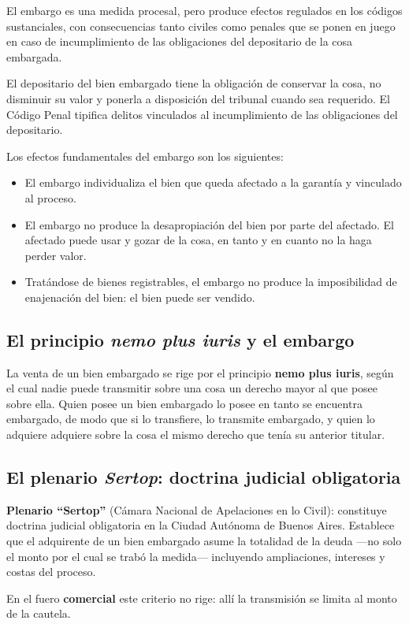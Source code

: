 \documentclass[12pt,oneside]{book}
\begin{document}
El embargo es una medida procesal, pero produce efectos regulados en los códigos sustanciales, con consecuencias tanto civiles como penales que se ponen en juego en caso de incumplimiento de las obligaciones del depositario de la cosa embargada.

\begin{important}
El depositario del bien embargado tiene la obligación de conservar la cosa, no disminuir su valor y ponerla a disposición del tribunal cuando sea requerido. El Código Penal tipifica delitos vinculados al incumplimiento de las obligaciones del depositario.
\end{important}

Los efectos fundamentales del embargo son los siguientes:

\begin{itemize}
    \item El embargo individualiza el bien que queda afectado a la garantía y vinculado al proceso.
    \item El embargo no produce la desapropiación del bien por parte del afectado. El afectado puede usar y gozar de la cosa, en tanto y en cuanto no la haga perder valor.
    \item Tratándose de bienes registrables, el embargo no produce la imposibilidad de enajenación del bien: el bien puede ser vendido.
\end{itemize}

\subsection{El principio \textit{nemo plus iuris} y el embargo}

La venta de un bien embargado se rige por el principio \textbf{nemo plus iuris}, según el cual nadie puede transmitir sobre una cosa un derecho mayor al que posee sobre ella. Quien posee un bien embargado lo posee en tanto se encuentra embargado, de modo que si lo transfiere, lo transmite embargado, y quien lo adquiere adquiere sobre la cosa el mismo derecho que tenía su anterior titular.

\subsection{El plenario \textit{Sertop}: doctrina judicial obligatoria}

\begin{important}
\textbf{Plenario ``Sertop''} (Cámara Nacional de Apelaciones en lo Civil): constituye doctrina judicial obligatoria en la Ciudad Autónoma de Buenos Aires. Establece que el adquirente de un bien embargado asume la totalidad de la deuda ---no solo el monto por el cual se trabó la medida--- incluyendo ampliaciones, intereses y costas del proceso.

En el fuero \textbf{comercial} este criterio no rige: allí la transmisión se limita al monto de la cautela.
\end{important}
\end{document}
